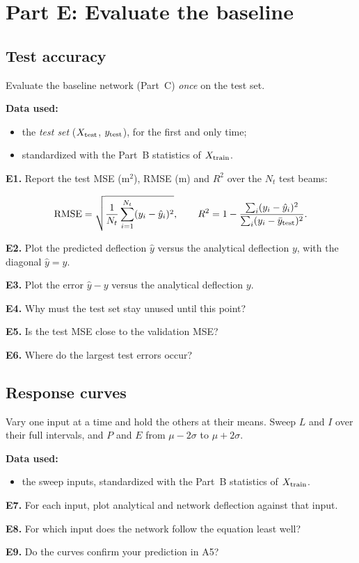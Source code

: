 \documentclass[11pt]{article}
\newcommand{\question}[2]{\par\noindent\textbf{#1.} #2\par}
\newcommand{\datause}[1]{\par\smallskip\needspace{4\baselineskip}\noindent\textbf{Data used:}\nopagebreak\begin{itemize}#1\end{itemize}}
\begin{document}
\section*{Part E: Evaluate the baseline}
\subsection*{Test accuracy}
\aitrap Evaluate the baseline network (Part~C) \emph{once} on the test set.
\datause{
  \item the \emph{test set} ($X_{\rm test}$, $y_{\rm test}$), for the first and only time;
  \item standardized with the Part~B statistics of $X_{\rm train}$.}

\question{E1}{Report the test MSE (m$^2$), RMSE (m) and $R^2$ over the $N_t$ test beams:}
\[
\operatorname{RMSE}=\sqrt{\frac{1}{N_t}\sum_{i=1}^{N_t}(y_i-\hat y_i)^2},\qquad
R^2=1-\frac{\sum_i(y_i-\hat y_i)^2}{\sum_i(y_i-\bar y_{\rm test})^2}.
\]
\question{E2}{Plot the predicted deflection $\hat y$ versus the analytical deflection $y$, with the diagonal $\hat y=y$.}
\question{E3}{Plot the error $\hat y-y$ versus the analytical deflection $y$.}

\question{E4}{Why must the test set stay unused until this point?}
\question{E5}{Is the test MSE close to the validation MSE?}
\question{E6}{Where do the largest test errors occur?}

\subsection*{Response curves}
Vary one input at a time and hold the others at their means. Sweep $L$ and $I$ over their full intervals, and $P$ and $E$ from $\mu-2\sigma$ to $\mu+2\sigma$.
\datause{\item the sweep inputs, standardized with the Part~B statistics of $X_{\rm train}$.}

\question{E7}{For each input, plot analytical and network deflection against that input.}

\question{E8}{For which input does the network follow the equation least well?}
\question{E9}{Do the curves confirm your prediction in A5?}
\end{document}

